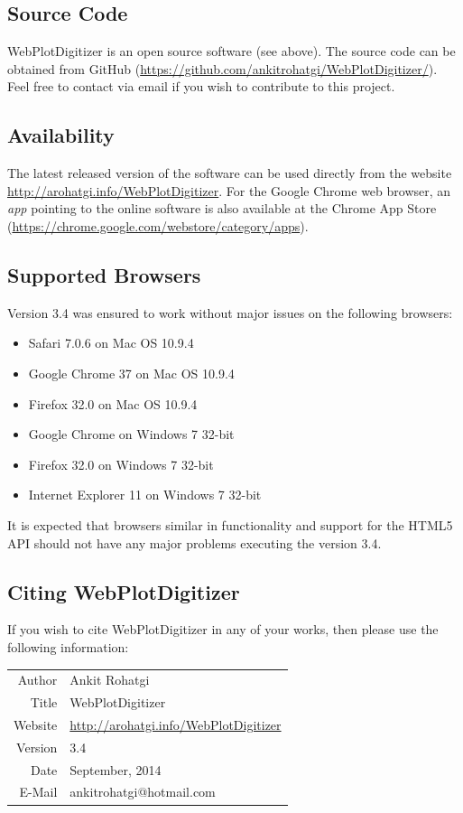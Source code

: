 \documentclass[letterpaper, 10pt]{article}
\begin{document}
\subsection{Source Code}
WebPlotDigitizer is an open source software (see above). The source code can be obtained from GitHub (\url{https://github.com/ankitrohatgi/WebPlotDigitizer/}). Feel free to contact via email if you wish to contribute to this project.

\subsection{Availability}
The latest released version of the software can be used directly from the website \url{http://arohatgi.info/WebPlotDigitizer}. For the Google Chrome web browser, an \emph{app} pointing to the online software is also available at the Chrome App Store (\url{https://chrome.google.com/webstore/category/apps}).

\subsection{Supported Browsers}
Version 3.4 was ensured to work without major issues on the following browsers:
\begin{itemize}
\item{Safari 7.0.6 on Mac OS 10.9.4}
\item{Google Chrome 37 on Mac OS 10.9.4}
\item{Firefox 32.0 on Mac OS 10.9.4}
\item{Google Chrome on Windows 7 32-bit}
\item{Firefox 32.0 on Windows 7 32-bit}
\item{Internet Explorer 11 on Windows 7 32-bit}
\end{itemize}
It is expected that browsers similar in functionality and support for the HTML5 API should not have any major problems executing the version 3.4.

\subsection{Citing WebPlotDigitizer}
If you wish to cite WebPlotDigitizer in any of your works, then please use the following information:

\begin{center}
\begin{tabular}{|r|l|}
\hline
Author & Ankit Rohatgi\\
Title & WebPlotDigitizer\\
Website & \url{http://arohatgi.info/WebPlotDigitizer}\\
Version & 3.4\\
Date & September, 2014\\
E-Mail & ankitrohatgi@hotmail.com\\
\hline
\end{tabular}
\end{center}
\end{document}
